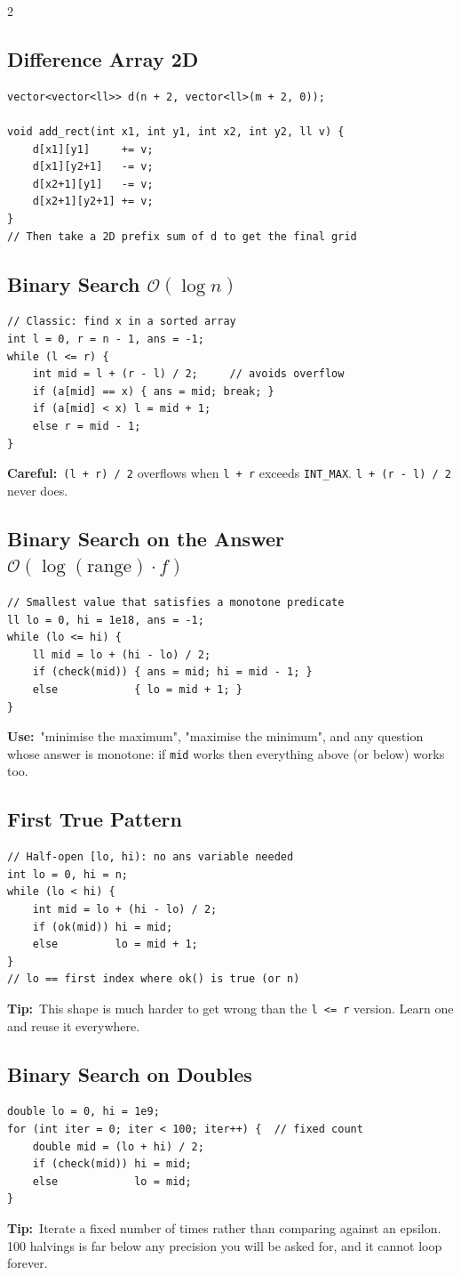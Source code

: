 \documentclass[10pt]{article}
\newcommand{\code}[1]{\texttt{\small #1}}
\newcommand{\sub}[2]{\subsection[#1]{#1\hspace{0.6em}%
  \textnormal{\color{accent2}\small$\mathcal{O}(#2)$}}}
\newcommand{\uses}[1]{{\color{accent2}\footnotesize\textbf{Use:}}~{\footnotesize #1}\par}
\newcommand{\tip}[1]{{\color{tipc}\footnotesize\textbf{Tip:}}~{\footnotesize #1}\par}
\newcommand{\warn}[1]{{\color{warnc}\footnotesize\textbf{Careful:}}~{\footnotesize #1}\par}
\begin{document}
\begin{multicols}{2}
\subsection{Difference Array 2D}
\begin{lstlisting}
vector<vector<ll>> d(n + 2, vector<ll>(m + 2, 0));

void add_rect(int x1, int y1, int x2, int y2, ll v) {
    d[x1][y1]     += v;
    d[x1][y2+1]   -= v;
    d[x2+1][y1]   -= v;
    d[x2+1][y2+1] += v;
}
// Then take a 2D prefix sum of d to get the final grid
\end{lstlisting}

\sub{Binary Search}{\log n}
\begin{lstlisting}
// Classic: find x in a sorted array
int l = 0, r = n - 1, ans = -1;
while (l <= r) {
    int mid = l + (r - l) / 2;     // avoids overflow
    if (a[mid] == x) { ans = mid; break; }
    if (a[mid] < x) l = mid + 1;
    else r = mid - 1;
}
\end{lstlisting}
\warn{\code{(l + r) / 2} overflows when \code{l + r} exceeds
\code{INT\_MAX}. \code{l + (r - l) / 2} never does.}

\sub{Binary Search on the Answer}{\log(\text{range}) \cdot f}
\begin{lstlisting}
// Smallest value that satisfies a monotone predicate
ll lo = 0, hi = 1e18, ans = -1;
while (lo <= hi) {
    ll mid = lo + (hi - lo) / 2;
    if (check(mid)) { ans = mid; hi = mid - 1; }
    else            { lo = mid + 1; }
}
\end{lstlisting}
\uses{"minimise the maximum", "maximise the minimum", and any question
whose answer is monotone: if \code{mid} works then everything above
(or below) works too.}

\subsection{First True Pattern}
\begin{lstlisting}
// Half-open [lo, hi): no ans variable needed
int lo = 0, hi = n;
while (lo < hi) {
    int mid = lo + (hi - lo) / 2;
    if (ok(mid)) hi = mid;
    else         lo = mid + 1;
}
// lo == first index where ok() is true (or n)
\end{lstlisting}
\tip{This shape is much harder to get wrong than the
\code{l <= r} version. Learn one and reuse it everywhere.}

\subsection{Binary Search on Doubles}
\begin{lstlisting}
double lo = 0, hi = 1e9;
for (int iter = 0; iter < 100; iter++) {  // fixed count
    double mid = (lo + hi) / 2;
    if (check(mid)) hi = mid;
    else            lo = mid;
}
\end{lstlisting}
\tip{Iterate a fixed number of times rather than comparing against an
epsilon. 100 halvings is far below any precision you will be asked for,
and it cannot loop forever.}


\end{multicols}
\end{document}
